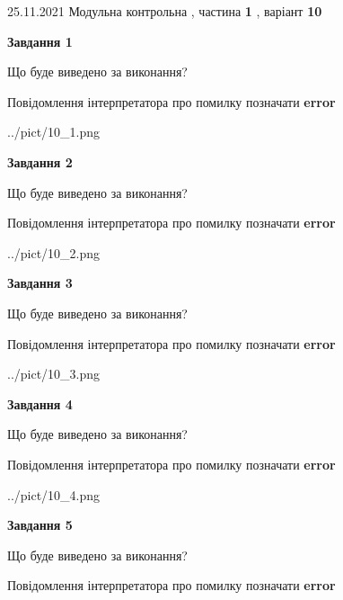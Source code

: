 \documentclass[10pt, ukrainian]{article}
\begin{document}
{25.11.2021 Модульна контрольна , частина \textbf { 1 }, варіант  \No \textbf { 10 }\par}
{
\begin {large}

{\begin {center}\textbf{Завдання 1}\end {center}}\par
Що буде виведено за виконання? \par
Повідомлення інтерпретатора про помилку позначати \textbf{error}

\begin{center}
	{../pict/10_1.png}
\end{center}
\newpage

{\begin {center}\textbf{Завдання 2}\end {center}}\par
Що буде виведено за виконання? \par
Повідомлення інтерпретатора про помилку позначати \textbf{error}

\begin{center}
	{../pict/10_2.png}
\end{center}
\newpage

{\begin {center}\textbf{Завдання 3}\end {center}}\par
Що буде виведено за виконання? \par
Повідомлення інтерпретатора про помилку позначати \textbf{error}

\begin{center}
	{../pict/10_3.png}
\end{center}
\newpage

{\begin {center}\textbf{Завдання 4}\end {center}}\par
Що буде виведено за виконання? \par
Повідомлення інтерпретатора про помилку позначати \textbf{error}

\begin{center}
	{../pict/10_4.png}
\end{center}
\newpage

{\begin {center}\textbf{Завдання 5}\end {center}}\par
Що буде виведено за виконання? \par
Повідомлення інтерпретатора про помилку позначати \textbf{error}


\end{large}}
\end{document}
